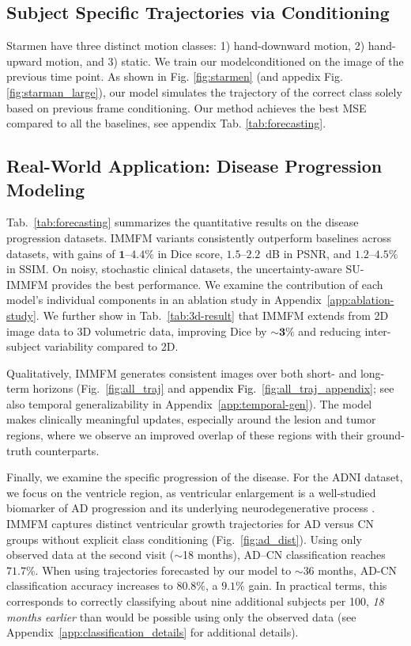 \documentclass[twoside]{article}
\begin{document}
\subsection{Subject Specific Trajectories via Conditioning}
Starmen have three distinct motion classes: 1) hand-downward motion,
2) hand-upward motion, and 3) static. We train our modelconditioned on the image of the previous time point. As shown in  Fig. \ref{fig:starmen} (and appedix Fig. \ref{fig:starman_large}), our model simulates the trajectory of the correct class solely based on previous frame conditioning. Our method achieves the best MSE compared to all the baselines, see appendix Tab. \ref{tab:forecasting}.

\subsection{Real-World Application: Disease Progression Modeling}
Tab.~\ref{tab:forecasting} summarizes the quantitative results on the disease progression datasets. IMMFM variants consistently outperform baselines across datasets, with gains of $\bm{1}$–$\bm{4.4\%}$ in Dice score, $\bm{1.5}$–$\bm{2.2}$~dB in PSNR, and $\bm{1.2}$–$\bm{4.5\%}$ in SSIM. On noisy, stochastic clinical datasets, the uncertainty-aware SU-IMMFM provides the best performance. We examine the contribution of each model's individual components in an ablation study in Appendix~\ref{app:ablation-study}. We further show in Tab.~\ref{tab:3d-result} that IMMFM extends from 2D image data to 3D volumetric data, improving Dice by $\bm{\sim3\%}$ and reducing inter-subject variability compared to 2D. 

Qualitatively, IMMFM generates consistent images over both short- and long-term horizons (Fig.~\ref{fig:all_traj} and \textcolor{black}{appendix Fig.~\ref{fig:all_traj_appendix}}; see also temporal generalizability in Appendix~\ref{app:temporal-gen}).
The model makes clinically meaningful updates, especially around the lesion and tumor regions, where we observe an improved overlap of these regions with their ground-truth counterparts. 

Finally, we examine the specific progression of the disease. For the ADNI dataset, we focus on the ventricle region, as ventricular enlargement is a well-studied biomarker of AD progression and its underlying neurodegenerative process \citep{nestor2008ventricular}. IMMFM captures distinct ventricular growth trajectories for AD versus CN groups without explicit class conditioning (Fig.~\ref{fig:ad_dist}). Using only observed data at the second visit ($\sim$18 months), AD–CN classification reaches $\bm{71.7\%}$. When using trajectories forecasted by our model to $\sim$36 months, AD-CN classification accuracy increases to $\bm{80.8\%}$, a $\bm{9.1\%}$ gain. In practical terms, this corresponds to correctly classifying about nine additional subjects per 100, \emph{18 months earlier} than would be possible using only the observed data (see Appendix~\ref{app:classification_details} for additional details).
\end{document}
